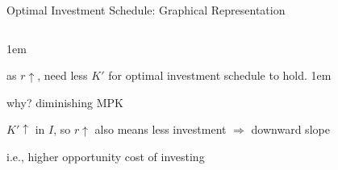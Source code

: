 \documentclass[11pt,aspectratio=43]{beamer}
\let\olditemize=\itemize
\let\endolditemize=\enditemize
\renewenvironment{itemize}{\olditemize \itemsep1em}{\endolditemize}
\theoremstyle{definition}
\begin{document}
\begin{frame}{Optimal Investment Schedule: Graphical Representation}
\begin{columns}
\begin{column}{0.5\textwidth}
             \begin{itemize}
                 \item as $ r \uparrow  $, need less $ K' $ for optimal investment schedule to hold.
                 \begin{itemize}
                     \item why? diminishing MPK
                 \end{itemize}
                 \item $ K' \uparrow  $ in $ I $, so $ r \uparrow  $ also means less investment $ \Rightarrow  $ \alert{downward slope}
                 \item i.e., higher opportunity cost of investing
             \end{itemize}
         \end{column}
     \end{columns}
\end{frame}
\end{document}

